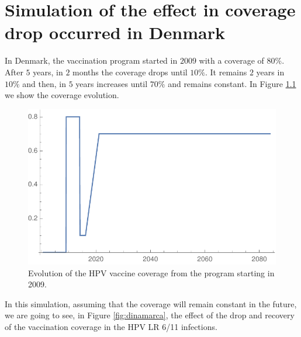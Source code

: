 \chapter{Simulation of the effect in coverage drop occurred in Denmark}\label{coverageDropDenmark}
In Denmark, the vaccination program started in $2009$ with a coverage of $80\%$. After $5$ years, in $2$ months the coverage drops until $10\%$. It remains $2$ years in $10\%$ and then, in $5$ years increases until $70\%$ and remains constant. In Figure \ref{fig:cobertura_danesa} we show the coverage evolution. 

\begin{figure}[h!]
	\centering
	\includegraphics[width=0.5\linewidth]{IMGs/8.-Dinamarca/Cobertura_Danesa.pdf}
	\caption{Evolution of the HPV vaccine coverage from the program starting in 2009.}
	\label{fig:cobertura_danesa}
\end{figure}

In this simulation, assuming that the coverage will remain constant in the future, we are going to see, in Figure \ref{fig:dinamarca}, the effect of the drop and recovery of the vaccination coverage in the HPV LR 6/11 infections.  

